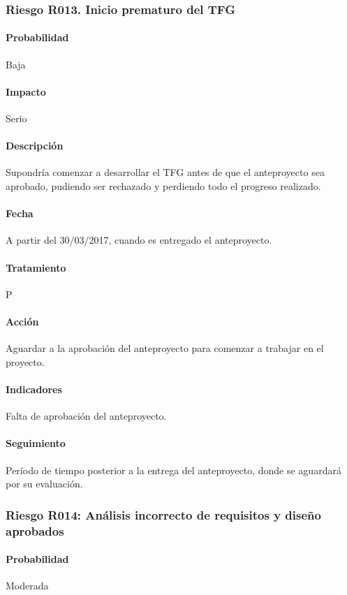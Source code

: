 \documentclass[10pt,a4paper]{article}
\begin{document}
				\subsubsection{Riesgo R013. Inicio prematuro del TFG}
				\paragraph{Probabilidad} Baja
				\paragraph{Impacto}	Serio
				\paragraph{Descripción} Supondría comenzar a desarrollar el TFG antes de que el anteproyecto sea aprobado, pudiendo ser rechazado y perdiendo todo el progreso realizado.
				\paragraph{Fecha} A partir del 30/03/2017, cuando es entregado el anteproyecto.
				\paragraph{Tratamiento} P
				\paragraph{Acción} Aguardar a la aprobación del anteproyecto para comenzar a trabajar en el proyecto.
				\paragraph{Indicadores} Falta de aprobación del anteproyecto.
				\paragraph{Seguimiento}	Período de tiempo posterior a la entrega del anteproyecto, donde se aguardará por su evaluación.
				
				\subsubsection{Riesgo R014: Análisis incorrecto de requisitos y diseño aprobados}
				\paragraph{Probabilidad} Moderada
\end{document}
